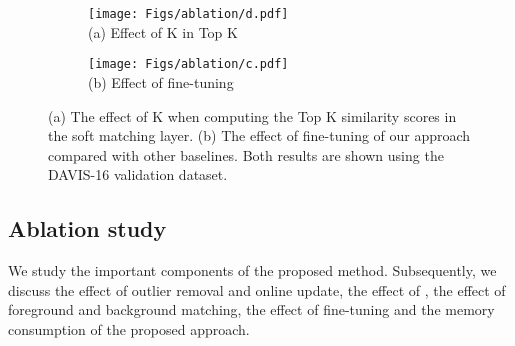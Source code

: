 \setlength{\figwidth}{0.35\textwidth}
\begin{figure*}[t]
\begin{center}
	\begin{subfigure}[b]{\figwidth}
		\texttt{[image: Figs/ablation/d.pdf]} \\ 
		\centering (a) Effect of K in Top K 
	\end{subfigure} \quad\quad
	\begin{subfigure}[b]{\figwidth}
		\texttt{[image: Figs/ablation/c.pdf]} \\
		\centering (b) Effect of fine-tuning
	\end{subfigure}\hfill
\end{center}
\caption{ (a) The effect of K when computing the Top K similarity scores  in the soft matching layer. (b) The effect of fine-tuning of our approach compared with other baselines. Both results are shown using the DAVIS-16 validation dataset.}
\label{fig:ablation}

\end{figure*}
 
\subsection{Ablation study}

We study the important components of the proposed method. Subsequently, we discuss the effect of outlier removal and online update, the effect of , the effect of foreground and background matching, the effect of fine-tuning and the memory consumption of the proposed approach.

